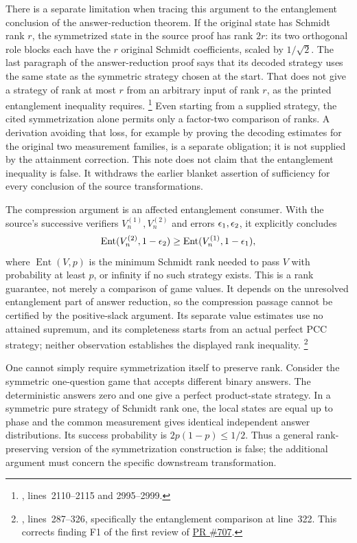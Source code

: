 \documentclass[11pt]{article}
\renewcommand{\ghpr}[1]{%
  \href{https://github.com/Dengnifer/MIPStarRE-QPBT/pull/#1}{PR \##1}}
\begin{document}
There is a separate limitation when tracing this argument to the entanglement
conclusion of the answer-reduction theorem. If the original state has Schmidt
rank $r$, the symmetrized state in the source proof has rank $2r$: its two
orthogonal role blocks each have the $r$ original Schmidt coefficients, scaled
by $1/\sqrt2$. The last paragraph of the answer-reduction proof says that its
decoded strategy uses the same state as the symmetric strategy chosen at the
start. That does not give a strategy of rank at most $r$ from an arbitrary
input of rank $r$, as the printed entanglement inequality requires.%
\footnote{,
lines~2110--2115 and 2995--2999.}
Even starting from a supplied strategy, the cited symmetrization alone permits
only a factor-two comparison of ranks. A derivation avoiding that loss,
for example by proving the decoding estimates for the original two
measurement families, is a separate obligation; it is not supplied by the
attainment correction. This note does not claim that the entanglement
inequality is false. It withdraws the earlier blanket assertion of sufficiency
for every conclusion of the source transformations.

The compression argument is an affected entanglement consumer. With the
source's successive verifiers $V_n^{(1)},V_n^{(2)}$ and errors
$\epsilon_1,\epsilon_2$, it explicitly concludes
\[
 \operatorname{Ent}(V_n^{(2)},1-\epsilon_2)
 \geq \operatorname{Ent}(V_n^{(1)},1-\epsilon_1),
\]
where $\operatorname{Ent}(V,p)$ is the minimum Schmidt rank needed to pass
$V$ with probability at least $p$, or infinity if no such strategy exists.
This is a rank guarantee, not merely a comparison of game values. It depends
on the unresolved entanglement part of
answer reduction, so the compression passage cannot be certified by the
positive-slack argument. Its separate value estimates use no attained
supremum, and its completeness starts from an actual perfect PCC strategy;
neither observation establishes the displayed rank inequality.%
\footnote{,
lines~287--326, specifically the entanglement comparison at line~322.
This corrects finding F1 of the first review of \ghpr{707}.}

One cannot simply require symmetrization itself to preserve rank. Consider
the symmetric one-question game that accepts different binary answers.
The deterministic answers zero and one give a perfect product-state strategy.
In a symmetric pure strategy of Schmidt rank one, the local states are equal
up to phase and the common measurement gives identical independent answer
distributions. Its success probability is $2p(1-p)\leq1/2$. Thus a general
rank-preserving version of the symmetrization construction is false; the
additional argument must concern the specific downstream transformation.
\end{document}

